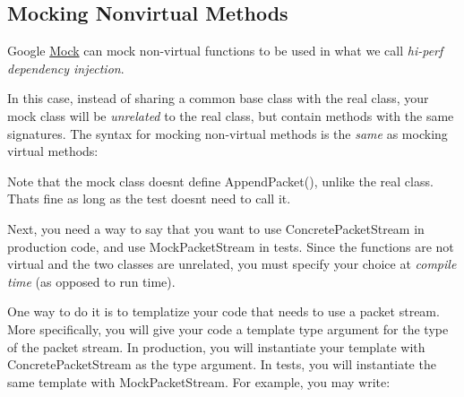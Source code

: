 \subsection*{Mocking Nonvirtual Methods}

Google \mbox{\hyperlink{class_mock}{Mock}} can mock non-\/virtual functions to be used in what we call {\itshape hi-\/perf dependency injection}.

In this case, instead of sharing a common base class with the real class, your mock class will be {\itshape unrelated} to the real class, but contain methods with the same signatures. The syntax for mocking non-\/virtual methods is the {\itshape same} as mocking virtual methods\+:


\begin{DoxyCode}{0}
\DoxyCodeLine{\};}
\DoxyCodeLine{}
\DoxyCodeLine{\};}
\end{DoxyCode}


Note that the mock class doesn\textquotesingle{}t define {\ttfamily Append\+Packet()}, unlike the real class. That\textquotesingle{}s fine as long as the test doesn\textquotesingle{}t need to call it.

Next, you need a way to say that you want to use {\ttfamily Concrete\+Packet\+Stream} in production code, and use {\ttfamily Mock\+Packet\+Stream} in tests. Since the functions are not virtual and the two classes are unrelated, you must specify your choice at {\itshape compile time} (as opposed to run time).

One way to do it is to templatize your code that needs to use a packet stream. More specifically, you will give your code a template type argument for the type of the packet stream. In production, you will instantiate your template with {\ttfamily Concrete\+Packet\+Stream} as the type argument. In tests, you will instantiate the same template with {\ttfamily Mock\+Packet\+Stream}. For example, you may write\+:


